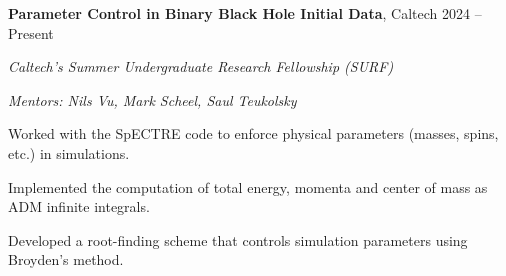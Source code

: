\begin{entry}
	{{\bf Parameter Control in Binary Black Hole Initial Data}, Caltech}
	{2024 -- Present}
	
	{\em Caltech's Summer Undergraduate Research Fellowship (SURF)}

	{\em Mentors: Nils Vu, Mark Scheel, Saul Teukolsky}

	Worked with the SpECTRE code to enforce physical parameters (masses, spins, etc.) in simulations.

	Implemented the computation of total energy, momenta and center of mass as ADM infinite integrals.

	Developed a root-finding scheme that controls simulation parameters using Broyden's method.


\end{entry}
